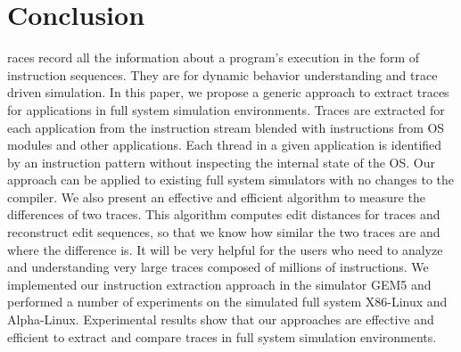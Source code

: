\documentclass[10pt,journal,cspaper,compsoc]{IEEEtran}
\begin{document}
\section{Conclusion}
races record all the information about a program's execution in the
form of instruction sequences. They are for dynamic behavior
understanding and trace driven simulation. In this paper, we propose
a generic approach to extract traces for applications in full system
simulation environments. Traces are extracted for each application
from the instruction stream blended with instructions from OS
modules and other applications. Each thread in a given application
is identified by an instruction pattern without inspecting the
internal state of the OS. Our approach can be applied to existing
full system simulators with no changes to the compiler. We also
present an effective and efficient algorithm to measure the
differences of two traces. This algorithm computes edit distances
for traces and reconstruct edit sequences, so that we know how
similar the two traces are and where the difference is. It will be
very helpful for the users who need to analyze and understanding
very large traces composed of millions of instructions. We
implemented our instruction extraction approach in the simulator
GEM5 and performed a number of experiments on the simulated full
system X86-Linux and Alpha-Linux. Experimental results show that our
approaches are effective and efficient to extract and compare traces
in full system simulation environments.



%
\end{document}
